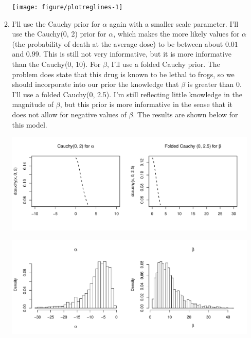 \documentclass[12pt]{article}\usepackage[]{graphicx}\usepackage[]{color}
\newenvironment{knitrout}{}{} %
\begin{document}
\begin{enumerate}
\begin{enumerate}
\begin{knitrout}
\end{knitrout}

\begin{knitrout}\footnotesize
{}\color{fgcolor}
\texttt{[image: figure/plotreglines-1]} 

\end{knitrout}

\item I'll use the Cauchy prior for $\alpha$ again with a smaller scale parameter. I'll use the Cauchy(0, 2) prior for $\alpha$, which makes the more likely values for $\alpha$ (the probability of death at the average dose) to be between about $0.01$ and $0.99$. This is still not very informative, but it is more informative than the Cauchy(0, 10). For $\beta$, I'll use a folded Cauchy prior. The problem does state that this drug is known to be lethal to frogs, so we should incorporate into our prior the knowledge that $\beta$ is greater than $0$. I'll use a folded Cauchy(0, 2.5). I'm still reflecting little knowledge in the magnitude of $\beta$, but this prior is more informative in the sense that it does not allow for negative values of $\beta$. The results are shown below for this model. 

\begin{knitrout}\footnotesize
{}\color{fgcolor}
\includegraphics[width=\linewidth]{figure/cauchyagain-1} 

\end{knitrout}




\begin{knitrout}\footnotesize
{}\color{fgcolor}
\includegraphics[width=\linewidth]{figure/compare5-1} 


\end{knitrout}
\end{enumerate}
\end{enumerate}
\end{document}
